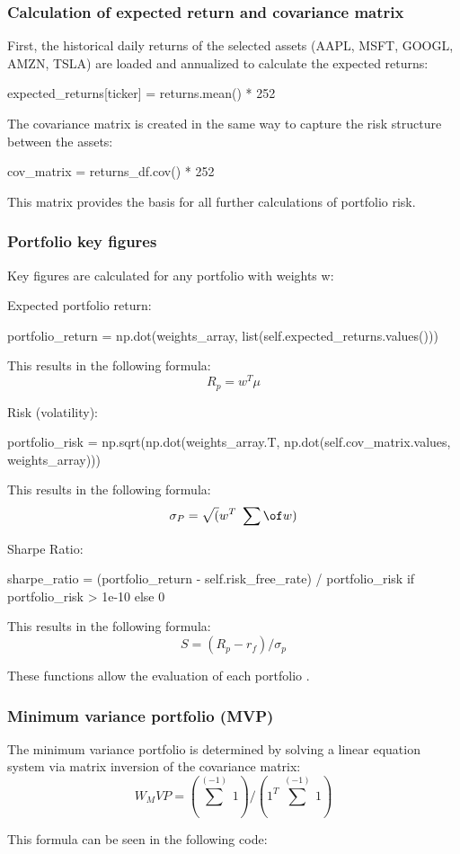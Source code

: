 \documentclass{agasthesis}
\begin{document}
\subsubsection{Calculation of expected return and covariance matrix}
First, the historical daily returns of the selected assets (AAPL, MSFT, GOOGL, AMZN, TSLA) are loaded and annualized to calculate the expected returns:

expected_returns[ticker] = returns.mean() * 252

The covariance matrix is created in the same way to capture the risk structure between the assets:

cov_matrix = returns_df.cov() * 252

This matrix provides the basis for all further calculations of portfolio risk.

\subsubsection{Portfolio key figures}
Key figures are calculated for any portfolio with weights w:

Expected portfolio return:

portfolio_return = np.dot(weights_array, list(self.expected_returns.values()))

This results in the following formula:
\[
R_p = w^{T} \mu
\]

Risk (volatility):

portfolio_risk = np.sqrt(np.dot(weights_array.T, np.dot(self.cov_matrix.values, weights_array)))

This results in the following formula:
\[
\sigma_P=\sqrt(w^T\ \sum\of w)
\]

Sharpe Ratio:

sharpe_ratio = (portfolio_return - self.risk_free_rate) / portfolio_risk if portfolio_risk > 1e-10 else 0

This results in the following formula:
\[
S=(R_p-r_f)/\sigma_p
\]

These functions allow the evaluation of each portfolio \cite[p. 225-310]{elton_modern_2009}.
\subsubsection{Minimum variance portfolio (MVP)}
The minimum variance portfolio is determined by solving a linear equation system via matrix inversion of the covariance matrix:
\[
W_MVP=(\sum^(-1)\ 1)/(1^T\ \sum^(-1)\ 1)
\]

This formula can be seen in the following code:
\end{document}

